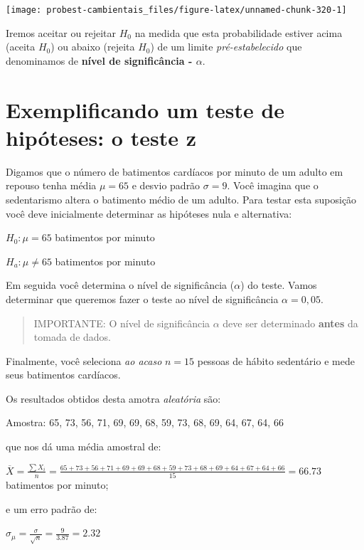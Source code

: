 \documentclass[
]{book}
\begin{document}
\begin{center}\texttt{[image: probest-cambientais\_files/figure-latex/unnamed-chunk-320-1]} \end{center}

Iremos aceitar ou rejeitar \(H_0\) na medida que esta probabilidade estiver acima (aceita \(H_0\)) ou abaixo (rejeita \(H_0\)) de um limite \emph{pré-estabelecido} que denominamos de \textbf{nível de significância - \(\alpha\)}.

\hypertarget{exemplificando-um-teste-de-hipuxf3teses-o-teste-z}{%
\section{Exemplificando um teste de hipóteses: o teste z}\label{exemplificando-um-teste-de-hipuxf3teses-o-teste-z}}

Digamos que o número de batimentos cardíacos por minuto de um adulto em repouso tenha média \(\mu = 65\) e desvio padrão \(\sigma = 9\). Você imagina que o sedentarismo altera o batimento médio de um adulto. Para testar esta suposição você deve inicialmente determinar as hipóteses nula e alternativa:

\(H_0: \mu = 65\) batimentos por minuto

\(H_a: \mu \ne 65\) batimentos por minuto

Em seguida você determina o nível de significância (\(\alpha\)) do teste. Vamos determinar que queremos fazer o teste ao nível de significância \(\alpha = 0,05\).

\begin{quote}
IMPORTANTE: O nível de significância \(\alpha\) deve ser determinado \textbf{antes} da tomada de dados.
\end{quote}

Finalmente, você seleciona \emph{ao acaso} \(n = 15\) pessoas de hábito sedentário e mede seus batimentos cardíacos.

Os resultados obtidos desta amotra \emph{aleatória} são:

Amostra: 65, 73, 56, 71, 69, 69, 68, 59, 73, 68, 69, 64, 67, 64, 66

que nos dá uma média amostral de:

\(\overline{X} = \frac{\sum{X_i}}{n} = \frac{65+73+56+71+69+69+68+59+73+68+69+64+67+64+66}{15} = 66.73\) batimentos por minuto;

e um erro padrão de:

\(\sigma_{\mu} = \frac{\sigma}{\sqrt{n}} = \frac{9}{3.87} = 2.32\)
\end{document}
